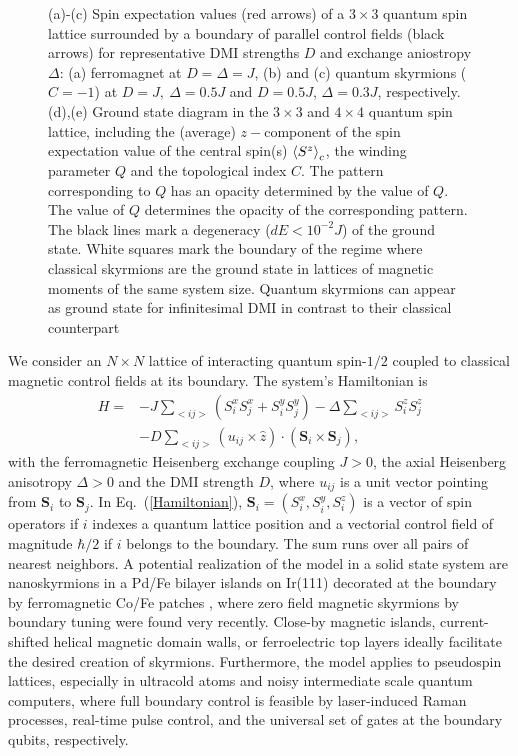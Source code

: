 \documentclass[reprint,aps,prb,superscriptaddress,10pt]{revtex4-2} %
\begin{document}
\begin{figure*}[!tb]
{	(a)-(c) Spin expectation values (red arrows) of a $3\times3$ quantum spin lattice surrounded by a boundary of parallel control fields (black arrows) for representative DMI strengths $D$ and exchange aniostropy $\Delta$: (a) ferromagnet at $D=\Delta=J$, (b) and (c) quantum skyrmions ($C=-1$) at  $D=J,~\Delta=0.5J$ and  $D=0.5J$, $\Delta=0.3J$, respectively.
	(d),(e) Ground state diagram in the $3\times3$ and $4\times4$ quantum spin lattice, including the (average) $z-$component of the spin expectation value of the central spin(s) $\braket{S^z}_c$, the winding parameter $Q$
	and the topological index $C$. The pattern corresponding to $Q$ has an opacity determined by the value of $Q$.
	The value of $Q$ determines the opacity of the corresponding pattern. The black lines mark a degeneracy ($dE<10^{-2}J$) of the ground state.	
	White squares mark the boundary of the regime where classical skyrmions  are the ground state in lattices of magnetic moments of the same system size.  Quantum skyrmions can appear as ground state for infinitesimal DMI in contrast to their classical counterpart
}
	\label{fig:Fig1}
\end{figure*}
We consider an $N\times N$ lattice of interacting quantum spin-$1/2$ coupled to classical magnetic control fields at its boundary. 
The system's Hamiltonian is
\begin{equation}\label{Hamiltonian}
\begin{split}
H=&-J\sum_{<ij>}(S^x_{i}S^x_{j}+S^y_{i}S^y_{j})-\Delta\sum_{<ij>}S^z_{i}S^z_{j}\\&-D\sum_{<ij>}({u}_{ij}\times\hat{z})\cdot(\textbf{S}_i\times \textbf{S}_j),
\end{split}
\end{equation}
with the ferromagnetic Heisenberg exchange coupling $J>0$, the axial  Heisenberg anisotropy $\Delta>0$ and the DMI strength $D$, where $u_{ij}$ is a unit vector pointing from $\textbf{S}_i$ to $\textbf{S}_j$.
In Eq.~(\ref{Hamiltonian}), $\textbf{S}_i=(S^x_i,S^y_i,S^z_i)$ is a vector of spin operators if $i$ indexes a quantum lattice position and a vectorial control field of magnitude $\hbar/2$
if $i$ belongs to the boundary. 
The sum runs over all pairs of nearest neighbors.
A potential realization of the model in a solid state system are nanoskyrmions in a Pd/Fe bilayer islands on Ir(111) decorated at the boundary by ferromagnetic Co/Fe patches \cite{Spethmann2021}, where zero field magnetic skyrmions by boundary tuning were found very recently. Close-by magnetic islands, current-shifted helical magnetic domain walls, or ferroelectric top layers ideally facilitate the desired creation of skyrmions. Furthermore, the model applies to pseudospin lattices, especially in ultracold atoms and noisy intermediate scale quantum computers, where full boundary control is feasible by laser-induced Raman processes, real-time pulse control, and the universal set of gates at the boundary qubits, respectively.
\end{document}
